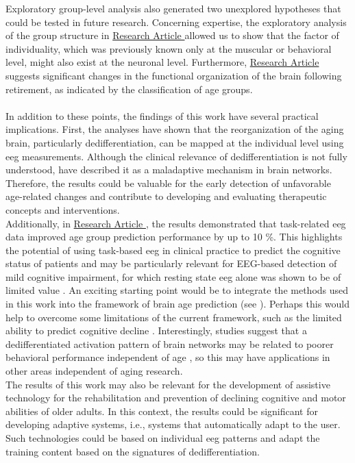 Exploratory group-level analysis also generated two unexplored hypotheses that could be tested in future research. Concerning expertise, the exploratory analysis of the group structure in \hyperref[results:paperIII]{Research Article } allowed us to show that the factor of individuality, which was previously known only at the muscular or behavioral level, might also exist at the neuronal level. Furthermore, \hyperref[results:paperII]{Research Article } suggests significant changes in the functional organization of the brain following retirement, as indicated by the classification of age groups.\\
\\
In addition to these points, the findings of this work have several practical implications. First, the analyses have shown that the reorganization of the aging brain, particularly dedifferentiation, can be mapped at the individual level using \gls{eeg} measurements. Although the clinical relevance of dedifferentiation is not fully understood, \citeauthor{Fornito2015} \cite{Fornito2015} have described it as a maladaptive mechanism in brain networks. Therefore, the results could be valuable for the early detection of unfavorable age-related changes and contribute to developing and evaluating therapeutic concepts and interventions.\\
Additionally, in \hyperref[results:paperII]{Research Article }, the results demonstrated that task-related \gls{eeg} data improved age group prediction performance by up to 10 \%. This highlights the potential of using task-based \gls{eeg} in clinical practice to predict the cognitive status of patients and may be particularly relevant for EEG-based detection of mild cognitive impairment, for which resting state \gls{eeg} alone was shown to be of limited value \cite{Froehlich2021, Farina2020}. An exciting starting point would be to integrate the methods used in this work into the framework of brain age prediction (see ). Perhaps this would help to overcome some limitations of the current framework, such as the limited ability to predict cognitive decline \cite{Tetereva2023}. Interestingly, studies suggest that a dedifferentiated activation pattern of brain networks may be related to poorer behavioral performance independent of age \cite{Koen2019}, so this may have applications in other areas independent of aging research.\\
The results of this work may also be relevant for the development of assistive technology for the rehabilitation and prevention of declining cognitive and motor abilities of older adults. In this context, the results could be significant for developing adaptive systems, i.e., systems that automatically adapt to the user. Such technologies could be based on individual \gls{eeg} patterns and adapt the training content based on the signatures of dedifferentiation.\\
